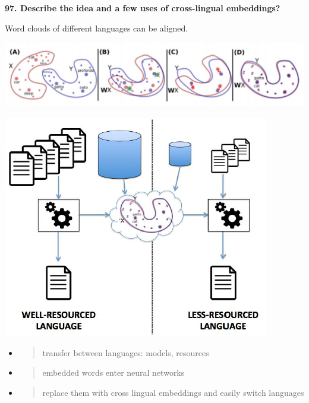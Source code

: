 \textbf{97. Describe the idea and a few uses of cross-lingual
embeddings?}

Word clouds of different languages can be aligned.

\includegraphics[width=\columnwidth]{media/image22.png}

\includegraphics[width=\columnwidth]{media/image27.png}

\begin{itemize}
\item
  \begin{quote}
  transfer between languages: models, resources
  \end{quote}
\end{itemize}

\begin{itemize}
\item
  \begin{quote}
  embedded words enter neural networks
  \end{quote}
\end{itemize}

\begin{itemize}
\item
  \begin{quote}
  replace them with cross lingual embeddings and easily switch languages
  \end{quote}
\end{itemize}

